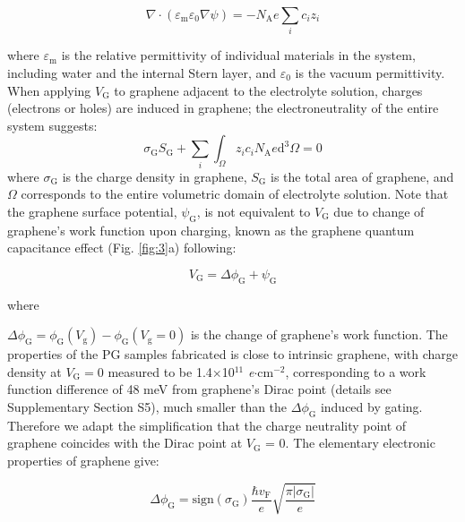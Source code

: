 \documentclass[journal=langd5,email=true, hyperref=true, keywords=false]{achemso}
\newcommand{\Fig}{Fig.}
\begin{document}
\begin{equation}
  \label{eq:poisson}
  \nabla \cdot (\varepsilon_{\mathrm{m}} \varepsilon_{0} \nabla \psi)
  =
  - N_{\mathrm{A}} e \sum_{i} c_{i} z_{i}
\end{equation}

where $\varepsilon_{\mathrm{m}}$ is the relative permittivity of
individual materials in the system, including water and the internal
Stern layer\cite{Tian_2017}, and
$\varepsilon_{0}$ is the vacuum permittivity. When applying
$V_{\mathrm{G}}$ to graphene adjacent to the electrolyte solution,
charges (electrons or holes) are induced in graphene; the
electroneutrality of the entire system suggests:
\begin{equation}
  \label{eq:electro-neutral}
  \sigma_{\mathrm{G}} S_{\mathrm{G}} + \sum_{i} \int_{\Omega} z_{i} c_{i} N_{\mathrm{A}} e \mathrm{d}^{3} \Omega= 0
\end{equation}
where $\sigma_{\mathrm{G}}$ is the charge density in graphene,
$S_{\mathrm{G}}$ is the total area of graphene, and $\Omega$
corresponds to the entire volumetric domain of electrolyte
solution. Note that the graphene surface potential,
$\psi_{\mathrm{G}}$, is not equivalent to $V_{\mathrm{G}}$ due to
change of graphene's work function upon charging, known as the
graphene quantum capacitance effect\cite{Xia_2009} (\Fig{}
\ref{fig:3}a) following:

\begin{equation}
  \label{eq:Vg}
  V_{\mathrm{G}} = \Delta \phi_{\mathrm{G}} + \psi_{\mathrm{G}}
\end{equation}

where

$\Delta \phi_{\mathrm{G}} = \phi_{\mathrm{G}}(V_{\mathrm{g}}) -
\phi_{\mathrm{G}}(V_{\mathrm{g}}=0)$ is the change of graphene’s work
function. The properties of the PG samples fabricated is close to
intrinsic graphene, with charge density at $V_{\mathrm{G}}=0$ measured
to be 1.4$\times$10$^{11}$ \textit{e}$\cdot$cm$^{-2}$, corresponding
to a work function difference of 48 meV from graphene's Dirac point
(details see Supplementary Section S5), much smaller than the
$\Delta \phi_{\mathrm{G}}$ induced by gating.  Therefore we adapt the
simplification that the charge neutrality point of graphene coincides
with the Dirac point at $V_{\mathrm{G}}$ = 0. The elementary
electronic properties of graphene give:

\begin{equation}
  \label{eq:delta-phiG}
  \Delta \phi_{\mathrm{G}} = \mathrm{sign}(\sigma_{\mathrm{G}}) \frac{\hbar v_{\mathrm{F}}}{e}
  \sqrt{\frac{\pi |\sigma_{\mathrm{G}}|}{e}}
\end{equation}
\end{document}
